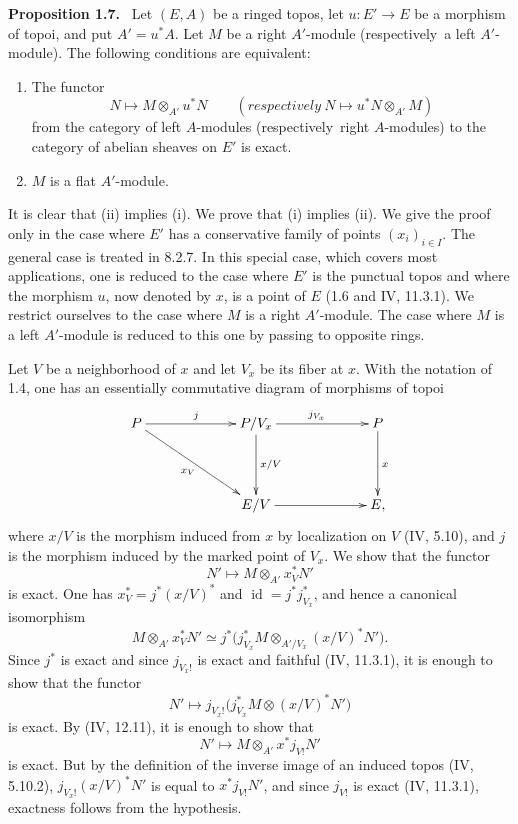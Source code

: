 \documentclass[11pt]{article}
\newcommand{\id}{\operatorname{id}}
\newcommand{\resp}{respectively}
\newenvironment{statement}[1]{\par\medskip\noindent\textbf{#1.}\ }{\par\medskip}
\begin{document}
\begin{statement}{Proposition 1.7}
Let $(E,A)$ be a ringed topos, let $u:E'\to E$ be a morphism of topoi, and put $A'=u^*A$. Let $M$ be a right $A'$-module (\resp\ a left $A'$-module). The following conditions are equivalent:
\begin{enumerate}[label=(\roman*)]
\item The functor
\[
N\longmapsto M\otimes_{A'}u^*N
\qquad
(\resp\ N\longmapsto u^*N\otimes_{A'}M)
\]
from the category of left $A$-modules (\resp\ right $A$-modules) to the category of abelian sheaves on $E'$ is exact.
\item $M$ is a flat $A'$-module.
\end{enumerate}
\end{statement}

It is clear that (ii) implies (i). We prove that (i) implies (ii). We give the proof only in the case where $E'$ has a conservative family of points $(x_i)_{i\in I}$. The general case is treated in 8.2.7. In this special case, which covers most applications, one is reduced to the case where $E'$ is the punctual topos and where the morphism $u$, now denoted by $x$, is a point of $E$ (1.6 and IV, 11.3.1). We restrict ourselves to the case where $M$ is a right $A'$-module. The case where $M$ is a left $A'$-module is reduced to this one by passing to opposite rings.

Let $V$ be a neighborhood of $x$ and let $V_x$ be its fiber at $x$. With the notation of 1.4, one has an essentially commutative diagram of morphisms of topoi
\[
\xymatrix@C=2.25cm@R=1.5cm{
P \ar[r]^{j}\ar[rd]_{x_V} & P/V_x \ar[r]^{j_{V_x}}\ar[d]^{x/V} & P\ar[d]^x\\
& E/V \ar[r] & E ,
}
\]
where $x/V$ is the morphism induced from $x$ by localization on $V$ (IV, 5.10), and $j$ is the morphism induced by the marked point of $V_x$. We show that the functor
\[
N'\longmapsto M\otimes_{A'}x_V^*N'
\]
is exact. One has $x_V^*=j^*(x/V)^*$ and $\id=j^*j_{V_x}^*$, and hence a canonical isomorphism
\[
M\otimes_{A'}x_V^*N'
\simeq
j^*\bigl(j_{V_x}^*M\otimes_{A'/V_x}(x/V)^*N'\bigr).
\]
Since $j^*$ is exact and since $j_{V_x!}$ is exact and faithful (IV, 11.3.1), it is enough to show that the functor
\[
N'\longmapsto j_{V_x!}\bigl(j_{V_x}^*M\otimes (x/V)^*N'\bigr)
\]
is exact. By (IV, 12.11), it is enough to show that
\[
N'\longmapsto M\otimes_{A'}x^*j_{V!}N'
\]
is exact. But by the definition of the inverse image of an induced topos (IV, 5.10.2), $j_{V_x!}(x/V)^*N'$ is equal to $x^*j_{V!}N'$, and since $j_{V!}$ is exact (IV, 11.3.1), exactness follows from the hypothesis.
\end{document}
